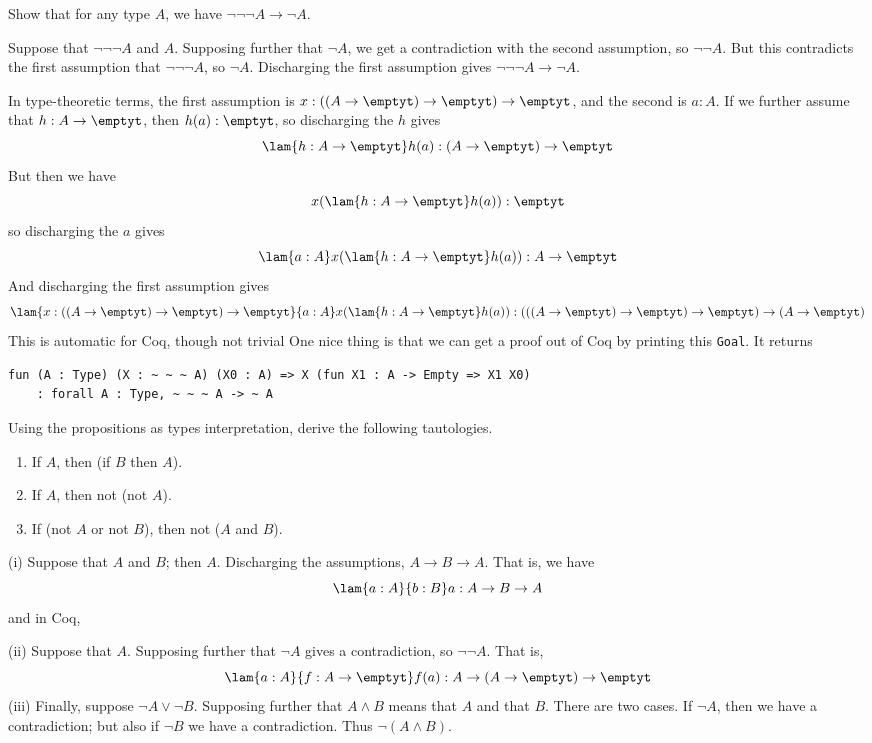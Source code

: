   Show that for any type $A$, we have $\lnot\lnot\lnot A \to
\lnot A$.

\soln Suppose that $\lnot\lnot\lnot A$ and $A$.  Supposing further that $\lnot
A$, we get a contradiction with the second assumption, so $\lnot \lnot A$.  But
this contradicts the first assumption that $\lnot\lnot\lnot A$, so $\lnot A$.
Discharging the first assumption gives $\lnot\lnot\lnot A \to \lnot A$.

In type-theoretic terms, the first assumption is $x : ((A \to \emptyt) \to
\emptyt) \to \emptyt$, and the second is $a : A$.  If we further assume that
$h : A \to \emptyt$, then $h(a) : \emptyt$, so discharging the $h$ gives
\[
  \lam{h:A \to \emptyt}h(a) : (A \to \emptyt) \to \emptyt
\]
But then we have
\[
  x(\lam{h : A \to \emptyt}h(a)) : \emptyt
\]
so discharging the $a$ gives
\[
  \lam{a:A}x(\lam{h : A \to \emptyt}h(a)) : A \to \emptyt
\]
And discharging the first assumption gives
\[
  \lam{x:((A\to\emptyt)\to\emptyt)\to\emptyt}{a:A}x(\lam{h : A \to
    \emptyt}h(a)) :
  (((A \to \emptyt) \to \emptyt) \to \emptyt) \to (A \to \emptyt)
\]
This is automatic for Coq, though not trivial
One nice thing is that we can get a proof out of Coq by printing this
\lstinline|Goal|.  It returns
\begin{lstlisting}
fun (A : Type) (X : ~ ~ ~ A) (X0 : A) => X (fun X1 : A -> Empty => X1 X0) 
    : forall A : Type, ~ ~ ~ A -> ~ A
\end{lstlisting}


  Using the propositions as types interpretation, derive the
following tautologies.
\begin{enumerate}
  \item If $A$, then (if $B$ then $A$).
  \item If $A$, then not (not $A$).
  \item If (not $A$ or not $B$), then not ($A$ and $B$).
\end{enumerate}

\soln (i)  Suppose that $A$ and $B$; then $A$.  Discharging the
assumptions, $A \to B \to A$.  That is, we
have 
\[
  \lam{a:A}{b:B}a : A \to B \to A
\]
and in Coq,

(ii)  Suppose that $A$.  Supposing further that $\lnot A$ gives a
contradiction, so $\lnot\lnot A$.  That is,
\[
  \lam{a:A}{f:A \to \emptyt}f(a) : A \to (A \to \emptyt) \to \emptyt
\]
(iii)
Finally, suppose $\lnot A \lor \lnot B$.  Supposing further that $A \land B$
means that $A$ and that $B$.  There are two cases.  If $\lnot A$, then we have
a contradiction; but also if $\lnot B$ we have a contradiction.  Thus $\lnot (A
\land B)$.

